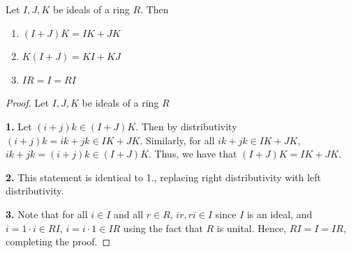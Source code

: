 \documentclass[12pt, a4paper, oneside, openright, titlepage]{book}
\begin{document}
\begin{rmk}
    Let $I,J, K$ be ideals of a ring $R$. Then \begin{enumerate}
        \item $(I+J)K = IK + JK$
        \item $K(I+J) = KI + KJ$
        \item $IR = I = RI$
    \end{enumerate}
    \begin{proof}
        Let $I,J,K$ be ideals of a ring $R$
        
        \textbf{1.} Let $(i+j)k \in (I+J)K$. Then by distributivity $(i+j)k = ik+jk \in IK+JK$. Similarly, for all $ik+jk \in IK+JK$, $ik+jk = (i+j)k \in (I+J)K$. Thus, we have that $(I+J)K = IK+JK$.
        
        \textbf{2.} This statement is identical to 1., replacing right distributivity with left distributivity.
        
        \textbf{3.} Note that for all $i \in I$ and all $r \in R$, $ir,ri \in I$ since $I$ is an ideal, and $i = 1\cdot i \in RI$, $i = i\cdot 1 \in IR$ using the fact that $R$ is unital. Hence, $RI = I  = IR$, completing the proof.
    \end{proof}
    \label{idealProps}
\end{rmk}
\end{document}
